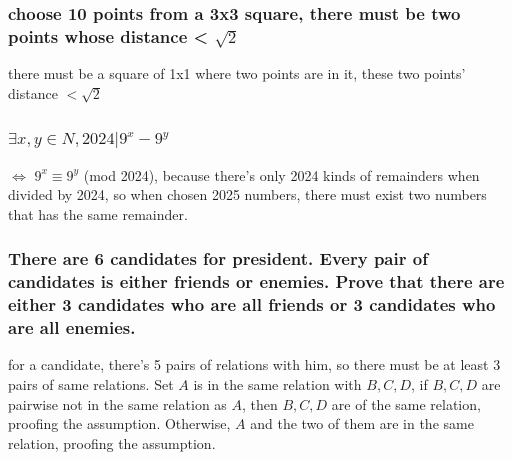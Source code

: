 \documentclass[12pt,a4paper]{ctexrep}
\begin{document}
\subsubsection{choose 10 points from a 3x3 square, there must be two points whose distance < $\sqrt{2}$}
there must be a square of 1x1 where two points are in it, these two points' distance $< \sqrt{2}$
\subsubsection{$\exists x,y \in N, 2024|9^x-9^y$}
$\iff$ $9^x \equiv 9^y$ (mod 2024), because there's only 2024 kinds of remainders when divided by 2024, so when chosen 2025 numbers, there must exist two numbers that has the same remainder.
\subsubsection{There are 6 candidates for president. Every pair of candidates is either friends or enemies. Prove that there are either 3 candidates who are all friends or 3 candidates who are all enemies.}
for a candidate, there's 5 pairs of relations with him, so there must be at least 3 pairs of same relations. Set $A$ is in the same relation with $B,C,D$, if $B,C,D$ are pairwise not in the same relation as $A$, then $B,C,D$ are of the same relation, proofing the assumption. Otherwise, $A$ and the two of them are in the same relation, proofing the assumption.

\ifdebug
\end{document}
